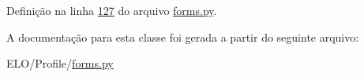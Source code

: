 Definição na linha \hyperlink{Profile_2forms_8py_source_l00127}{127} do arquivo \hyperlink{Profile_2forms_8py_source}{forms.\+py}.



A documentação para esta classe foi gerada a partir do seguinte arquivo\+:\begin{DoxyCompactItemize}
\item 
E\+L\+O/\+Profile/\hyperlink{Profile_2forms_8py}{forms.\+py}\end{DoxyCompactItemize}
